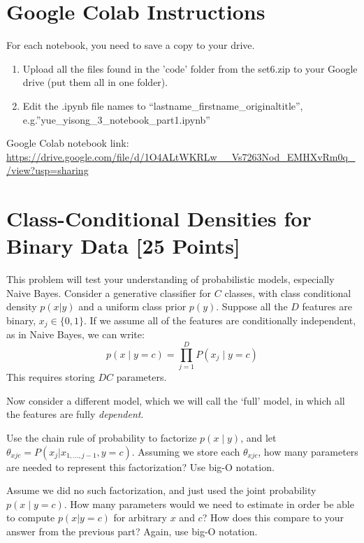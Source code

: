 \documentclass{article}
\begin{document}
\section*{Google Colab Instructions}

For each notebook, you need to save a copy to your drive.

\begin{enumerate}
	\item Upload all the files found in the 'code' folder from the set6.zip to your Google drive (put them all in one folder).
	\item Edit the .ipynb file names to “lastname_firstname_originaltitle”, e.g.”yue_yisong_3_notebook_part1.ipynb”
\end{enumerate}

\newpage

Google Colab notebook link: \url{https://drive.google.com/file/d/1O4ALtWKRLw__Vs7263Nod_EMHXvRm0q_/view?usp=sharing}



\section{Class-Conditional Densities for Binary Data [25 Points]}
This problem will test your understanding of probabilistic models, especially Naive Bayes.
Consider a generative classifier for $C$ classes, with class conditional density $p(x | y)$ and a uniform class prior $p(y)$. Suppose all the $D$ features are binary, $x_j \in \{0, 1 \}$. If we assume all of the features are conditionally independent, as in Naive Bayes, we can write:
$$p(x \mid y = c) = \prod_{j=1}^D P(x_j \mid y = c) $$
This requires storing $DC$ parameters. 

Now consider a different model, which we will call the `full' model, in which all the features are fully \textit{dependent}.

\problem[5] Use the chain rule of probability to factorize $p(x \mid y)$, and let $\theta_{xjc} = P(x_j | x_{1, \ldots, j - 1}, y = c)$. Assuming we store each $\theta_{xjc}$, how many parameters are needed to represent this factorization? Use big-O notation. 
\begin{subsolution}

\end{subsolution}
\newpage

\problem[5] Assume we did no such factorization, and just used the joint probability $p(x \mid y = c)$. How many parameters would we need to estimate in order be able to compute $p(x | y = c)$ for arbitrary $x$ and $c$? How does this compare to your answer from the previous part? Again, use big-O notation.
\begin{subsolution}
	
\end{subsolution}
\newpage
\end{document}
